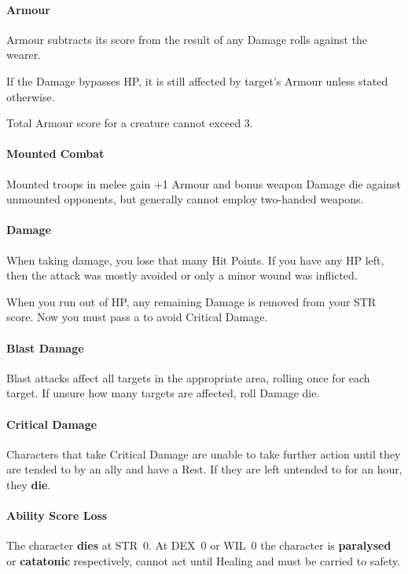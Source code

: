 \documentclass[itdr]{subfiles}
\begin{document}
\vfill
\paragraph{Armour}
Armour subtracts its score from the result of any Damage rolls against the wearer.

If the Damage bypasses HP, it is still affected by target's Armour unless stated otherwise.

Total Armour score for a creature cannot exceed 3.

\vfill
\paragraph{Mounted Combat}

Mounted troops in melee gain +1 Armour and bonus weapon Damage die against unmounted opponents, but generally cannot employ two-handed weapons.

\vfill
\paragraph{Damage}
When taking damage, you lose that many Hit Points. If you have any HP left, then the attack was mostly avoided or only a minor wound was inflicted.

When you run out of HP, any remaining Damage is removed from your STR score. Now you must pass a  to avoid Critical Damage.

\vfill
\paragraph{Blast Damage}
Blast attacks affect all targets in the appropriate area, rolling once for each target. If unsure how many targets are affected, roll Damage die.

\vfill
\paragraph{Critical Damage}
Characters that take Critical Damage are unable to take further action until they are tended to by an ally and have a Rest. If they are left untended to for an hour, they \textbf{die}.

\vfill
\paragraph{Ability Score Loss}
The character \textbf{dies} at STR~0. At DEX~0 or WIL~0 the character is \textbf{paralysed} or \textbf{catatonic} respectively, cannot act until Healing and must be carried to safety.
\end{document}
